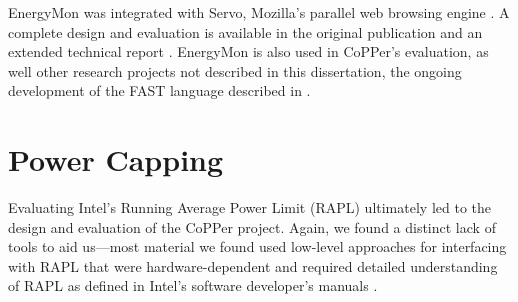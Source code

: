 EnergyMon was integrated with Servo, Mozilla's parallel web browsing engine \cite{servo}.
A complete design and evaluation is available in the original publication \cite{energymon} and an extended technical report \cite{EnergyMonTR}.
EnergyMon is also used in CoPPer's evaluation, as well other research projects not described in this dissertation, \eg the ongoing development of the FAST language described in .


\section{Power Capping}
\label{app:powercap}

Evaluating Intel's Running Average Power Limit (RAPL) \cite{RAPL} ultimately led to the design and evaluation of the CoPPer project.
Again, we found a distinct lack of tools to aid us---most material we found used low-level approaches for interfacing with RAPL that were hardware-dependent and required detailed understanding of RAPL as defined in Intel's software developer's manuals \cite{intel-sdm}.

